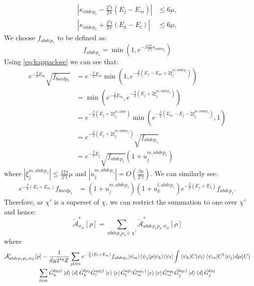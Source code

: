 \documentclass[aps,floatfix,10pt,amssymb,amsfont,amsmath,superscriptaddress,float,nofootinbib,longbibliography,nobalancelastpage,twocolumn]{revtex4-2}
\begin{document}
\begin{widetext}
\begin{equation}
\begin{aligned}
    \left|\kappa_{abdep_1}-\frac{2^{\eta}t}{2\pi}(E_j-E_m)\right|&\leq 6\mu,\\
    \left|\kappa_{abdep_1}+\frac{2^{\eta}t}{2\pi}(E_k-E_l)\right|&\leq 6\mu,
\end{aligned}
\label{eq:kappaclose}
\end{equation}
We choose $f_{abdep_1}$ to be defined as:
\begin{equation}
    f_{abdep_1} = \min(1,e^{-\beta\frac{2\pi}{2^{\eta}t}\kappa_{abdep_1}})
\end{equation}
Using \eqref{eq:kappaclose} we can see that:
\begin{equation}
    \begin{aligned}
    e^{-\frac{\beta}{2}E_m}\sqrt{f_{baedp_1}} &= e^{-\frac{\beta}{2}E_m}\min(1,e^{-\frac{\beta}{2}(E_j-E_m + 2\xi^{m,abdep_1}_j)})\\
    &= \min\!\left(e^{-\frac{\beta}{2}E_m}, e^{-\frac{\beta}{2}(E_j + 2\xi^{m,abdep_1}_j)}\right)\\
    &= e^{-\frac{\beta}{2}(E_j+ 2\xi^{m,abde}_j)} \min(e^{-\frac{\beta}{2}(E_m-E_j-2\xi^{m,abdep_1}_j)},1)\\
    &= e^{-\frac{\beta}{2}(E_j+ 2\xi^{m,abdep_1}_j)}\sqrt{f_{abdep_1}}\\
    &= e^{-\frac{\beta}{2}E_j}\sqrt{f_{abdep_1}}(1+u^{m,abdep_1}_j)
\end{aligned}
\end{equation}
where $|\xi^{m,abdep_1}_j| \leq \frac{12\pi}{2^{\eta}t}\mu$
and $|u^{m,abdep_1}_j| = O(\frac{\beta \mu}{2^{\eta}t})$. We can similarly see:
\begin{equation}
\begin{aligned}
e^{-\frac{\beta}{2}(E_l+E_m)}f_{baedp_1}
&=(1+u_j^{m,abdep_1})(1+u_k^{l,abdep_1})e^{-\frac{\beta}{2}(E_j+E_k)}f_{abdep_1}.
\end{aligned}
\label{eq:fabtofba}
\end{equation}
Therefore, as $\chi'$ is a superset of $\chi$, we can restrict the summation to one over $\chi'$ and hence:
\begin{equation}
    \tilde{\mathcal{A}}^*_{\sigma_G}[\rho] =  \sum_{abdep_1p_3\in \chi'}\tilde{\mathcal{A}}^*_{abdep_1p_3,\sigma_G}[\rho]
\end{equation}
where 
\begin{multline}
  \tilde{\mathcal{A}}^*_{abdep_1p_3,\sigma_G}[\rho] = \frac{1}{d_R2^{4\eta}Z} \sum_{jklm}  e^{-\frac{\beta}{2}(E_l+E_m)}{f_{abdep_1}} {\ket{\psi_m}}{\bra{\psi_j}}\rho{\ket{\psi_k}}{\bra{\psi_l}} \int {\braket{\psi_k|C|\psi_l}\braket{\psi_m|C^{\dagger}|\psi_j}} d\mu(C)\\\sum_{p_2q_1} {\tilde G^{bp_3\dagger}_k\ket{d}\bra{d}\tilde G^{bp_2}_k} {\tilde G_l^{ap_2\dagger}\ket{e}\bra{e}\tilde G_l^{ap_1}\tilde G_m^{ap_1\dagger}\ket{e}\bra{e}\tilde G_m^{aq_1}} {\tilde G^{bq_1\dagger}_j\ket{d}\bra{d}\tilde G^{bp_3}_j } 

\end{multline}
\end{widetext}
\end{document}
